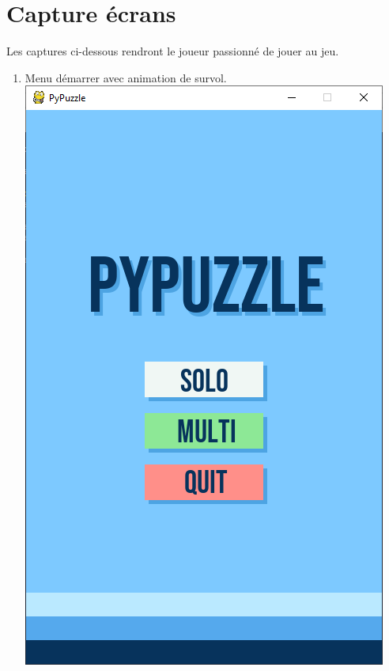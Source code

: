 \documentclass[a4paper]{report}
\begin{document}
\section{Capture écrans}
Les captures ci-dessous rendront le joueur passionné de jouer au jeu.
\begin{enumerate}
    \item Menu démarrer avec animation de survol.\\
        \includegraphics[scale=0.3]{images/1-menu.png}

\end{enumerate}
\end{document}
